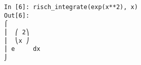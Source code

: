 ﻿\documentclass{article}
\begin{document}
\normalsize
\begin{Verbatim}
In [6]: risch_integrate(exp(x**2), x)
Out[6]: 
⌠         
⎮  ⎛ 2⎞   
⎮  ⎝x ⎠   
⎮ e     dx
⌡         
\end{Verbatim}
\end{document}
